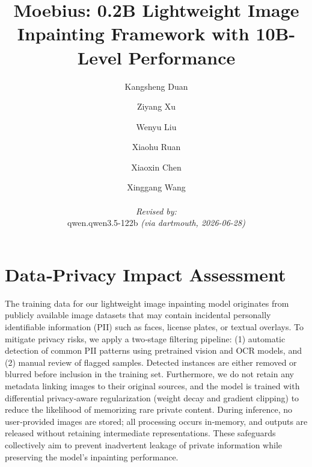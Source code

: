 \documentclass{llmxive}
\begin{document}
\section{Data‑Privacy Impact Assessment}
The training data for our lightweight image inpainting model originates from publicly available image
datasets that may contain incidental personally identifiable information (PII) such as faces,
license plates, or textual overlays. To mitigate privacy risks, we apply a two‑stage
filtering pipeline: (1) automatic detection of common PII patterns using pretrained vision
and OCR models, and (2) manual review of flagged samples. Detected instances are either
removed or blurred before inclusion in the training set. Furthermore, we do not retain any
metadata linking images to their original sources, and the model is trained with differential
privacy‑aware regularization (weight decay and gradient clipping) to reduce the likelihood of
memorizing rare private content. During inference, no user‑provided images are stored; all
processing occurs in‑memory, and outputs are released without retaining intermediate
representations. These safeguards collectively aim to prevent inadvertent leakage of
private information while preserving the model’s inpainting performance.
\title{Moebius: 0.2B Lightweight Image Inpainting Framework with 10B-Level Performance}

\author{
  Kangsheng Duan \and Ziyang Xu \and Wenyu Liu \and Xiaohu Ruan \and Xiaoxin Chen \and Xinggang Wang
  \par\hrule\par
  \textit{Revised by:}\\
  qwen.qwen3.5-122b \textit{(via dartmouth, 2026-06-28)}
}





\let\thefootnote\relax{}
\let\thefootnote\relax{}
\let\thefootnote\relax{}
\end{document}
